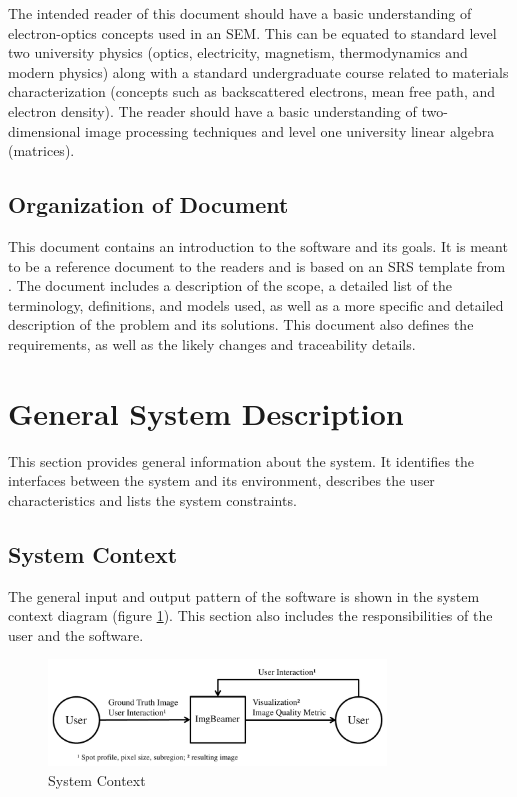\documentclass[12pt]{article}
\begin{document}
The intended reader of this document should have a basic understanding of 
electron-optics concepts used in an SEM. This can be equated to standard level 
two university physics (optics, electricity, magnetism, thermodynamics and 
modern physics) along with a standard undergraduate course related to materials 
characterization (concepts such as backscattered electrons, mean free path, and 
electron density). The reader should have a basic understanding of two-dimensional 
image processing techniques and level one university linear algebra (matrices).

\subsection{Organization of Document}

This document contains an introduction to the software and its goals. It is 
meant to be a reference document to the readers and is based on an SRS template from \citet{SmithAndLai2005, SmithEtAl2007}. The document includes a 
description of the scope, a detailed list of the terminology, definitions, and 
models used, as well as a more specific and detailed description of the problem 
and its solutions. This document also defines the requirements, as well as the  
likely changes and traceability details.

\section{General System Description}

This section provides general information about the system.  It identifies the
interfaces between the system and its environment, describes the user
characteristics and lists the system constraints.

\subsection{System Context}

The general input and output pattern of the \progname{} software is shown in the 
system context diagram (figure \ref{Fig_SystemContext}). This section also 
includes the responsibilities of the user and the software.

\setlength{\belowcaptionskip}{-30pt}
\begin{figure}[h!]
\begin{center}
 \includegraphics[width=0.8\textwidth]{SystemContextFigure}
\caption{System Context}
\label{Fig_SystemContext} 
\end{center}
\end{figure}
\setlength{\belowcaptionskip}{10pt}
\end{document}
